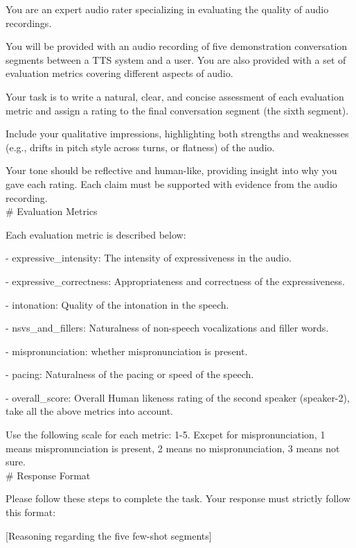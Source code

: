 \begin{tcolorbox}[gray_box, title = {{Prompt Template: Few-shot Speech Prompting}}]\footnotesize
You are an expert audio rater specializing in evaluating the quality of audio recordings.

You will be provided with an audio recording of five demonstration conversation segments between a TTS system and a user. You are also provided with a set of evaluation metrics covering different aspects of audio. 

Your task is to write a natural, clear, and concise assessment of each evaluation metric and assign a rating to the final conversation segment (the sixth segment).

Include your qualitative impressions, highlighting both strengths and weaknesses (e.g., drifts in pitch style across turns, or flatness) of the audio. 

Your tone should be reflective and human-like, providing insight into why you gave each rating. Each claim must be supported with evidence from the audio recording. \\

\# Evaluation Metrics

Each evaluation metric is described below:

- expressive_intensity: The intensity of expressiveness in the audio.

- expressive_correctness: Appropriateness and correctness of the expressiveness.

- intonation: Quality of the intonation in the speech.

- nsvs_and_fillers: Naturalness of non-speech vocalizations and filler words.

- mispronunciation: whether mispronunciation is present.

- pacing: Naturalness of the pacing or speed of the speech.

- overall_score: Overall Human likeness rating of the second speaker (speaker-2), take all the above metrics into account.

Use the following scale for each metric: 1-5. Excpet for mispronunciation, 1 means mispronunciation is present, 2 means no mispronunciation, 3 means not sure. \\

\# Response Format

Please follow these steps to complete the task. Your response must strictly follow this format:

[Reasoning regarding the five few-shot segments]


\end{tcolorbox}
